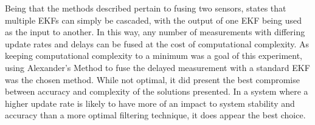 Being that the methods described pertain to fusing two sensors, \cite{multi} states that multiple EKFs can simply be cascaded, with the output of one EKF being used as the input to another. In this way, any number of measurements with differing update rates and delays can be fused at the cost of computational complexity. As keeping computational complexity to a minimum was a goal of this experiment, using Alexander's Method to fuse the delayed measurement with a standard EKF was the chosen method. While not optimal, it did present the best compromise between accuracy and complexity of the solutions presented. In a system where a higher update rate is likely to have more of an impact to system stability and accuracy than a more optimal filtering technique, it does appear the best choice.